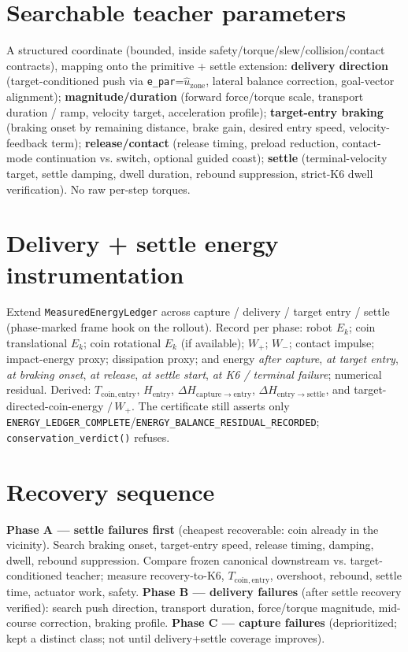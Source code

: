 \documentclass[11pt]{article}
\newcommand{\code}[1]{\texttt{\small #1}}
\newcommand{\gate}[1]{\textcolor{blue!55!black}{\texttt{\small #1}}}
\begin{document}
\section{Searchable teacher parameters}
A structured coordinate (bounded, inside safety/torque/slew/collision/contact contracts), mapping onto the primitive +
settle extension: \textbf{delivery direction} (target-conditioned push via \code{e\_par}=$\hat u_{\mathrm{zone}}$, lateral
balance correction, goal-vector alignment); \textbf{magnitude/duration} (forward force/torque scale, transport duration /
ramp, velocity target, acceleration profile); \textbf{target-entry braking} (braking onset by remaining distance, brake
gain, desired entry speed, velocity-feedback term); \textbf{release/contact} (release timing, preload reduction,
contact-mode continuation vs. switch, optional guided coast); \textbf{settle} (terminal-velocity target, settle damping,
dwell duration, rebound suppression, strict-K6 dwell verification). No raw per-step torques.

\section{Delivery + settle energy instrumentation}
Extend \code{MeasuredEnergyLedger} across capture / delivery / target entry / settle (phase-marked frame hook on the
rollout). Record per phase: robot $E_k$; coin translational $E_k$; coin rotational $E_k$ (if available); $W_+$; $W_-$;
contact impulse; impact-energy proxy; dissipation proxy; and energy \emph{after capture}, \emph{at target entry}, \emph{at
braking onset}, \emph{at release}, \emph{at settle start}, \emph{at K6 / terminal failure}; numerical residual. Derived:
$T_{\mathrm{coin,entry}}$, $H_{\mathrm{entry}}$, $\Delta H_{\mathrm{capture}\to\mathrm{entry}}$,
$\Delta H_{\mathrm{entry}\to\mathrm{settle}}$, and target-directed-coin-energy $/\,W_+$. The certificate still asserts only
\gate{ENERGY\_LEDGER\_COMPLETE}/\gate{ENERGY\_BALANCE\_RESIDUAL\_RECORDED}; \code{conservation\_verdict()} refuses.

\section{Recovery sequence}
\textbf{Phase A --- settle failures first} (cheapest recoverable: coin already in the vicinity). Search braking onset,
target-entry speed, release timing, damping, dwell, rebound suppression. Compare frozen canonical downstream vs.
target-conditioned teacher; measure recovery-to-K6, $T_{\mathrm{coin,entry}}$, overshoot, rebound, settle time, actuator
work, safety. \textbf{Phase B --- delivery failures} (after settle recovery verified): search push direction, transport
duration, force/torque magnitude, mid-course correction, braking profile. \textbf{Phase C --- capture failures}
(deprioritized; kept a distinct class; not until delivery+settle coverage improves).
\end{document}
